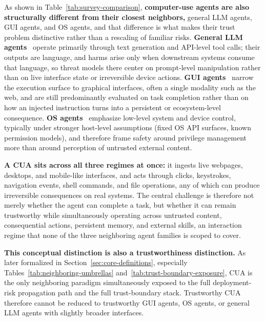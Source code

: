 As shown in Table~\ref{tab:survey-comparison}, \textbf{computer-use agents are also structurally different from their closest neighbors,} general LLM agents, GUI agents, and OS agents, and that difference is what makes their trust problem distinctive rather than a rescaling of familiar risks. \textbf{General LLM agents}~\cite{attackdefenselandscape2026} operate primarily through text generation and API-level tool calls; their outputs are language, and harms arise only when downstream systems consume that language, so threat models there center on prompt-level manipulation rather than on live interface state or irreversible device actions. \textbf{GUI agents}~\cite{foundationguisurvey2024,nguyen2025gui} narrow the execution surface to graphical interfaces, often a single modality such as the web, and are still predominantly evaluated on task completion rather than on how an injected instruction turns into a persistent or ecosystem-level consequence. \textbf{OS agents}~\cite{hu2025osagents} emphasize low-level system and device control, typically under stronger host-level assumptions (fixed OS API surfaces, known permission models), and therefore frame safety around privilege management more than around perception of untrusted external content.

\textbf{A CUA sits across all three regimes at once:} it ingests live webpages, desktops, and mobile-like interfaces, and acts through clicks, keystrokes, navigation events, shell commands, and file operations, any of which can produce irreversible consequences on real systems. The central challenge is therefore not merely whether the agent can complete a task, but whether it can remain trustworthy while simultaneously operating across untrusted content, consequential actions, persistent memory, and external skills, an interaction regime that none of the three neighboring agent families is scoped to cover.

\textbf{This conceptual distinction is also a trustworthiness distinction.} As later formalized in Section~\ref{sec:core-definitions}, especially Tables~\ref{tab:neighboring-umbrellas} and~\ref{tab:trust-boundary-exposure}, CUA is the only neighboring paradigm simultaneously exposed to the full deployment-risk propagation path and the full trust-boundary stack. Trustworthy CUA therefore cannot be reduced to trustworthy GUI agents, OS agents, or general LLM agents with slightly broader interfaces.

